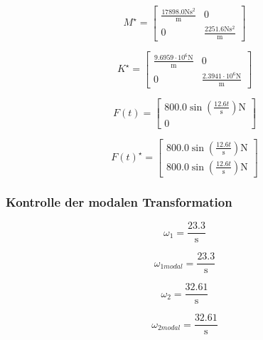 \documentclass[
  letterpaper,
  DIV=11]{scrreprt}
\begin{document}
\begin{equation}M^{\star} = \left[\begin{matrix}\frac{17898.0 \text{N} \text{s}^{2}}{\text{m}} & 0\\0 & \frac{2251.6 \text{N} \text{s}^{2}}{\text{m}}\end{matrix}\right]\end{equation}

\begin{equation}K^{\star} = \left[\begin{matrix}\frac{9.6959 \cdot 10^{6} \text{N}}{\text{m}} & 0\\0 & \frac{2.3941 \cdot 10^{6} \text{N}}{\text{m}}\end{matrix}\right]\end{equation}

\begin{equation}F(t) = \left[\begin{matrix}800.0 \sin{\left(\frac{12.6 t}{\text{s}} \right)} \text{N}\\0\end{matrix}\right]\end{equation}

\begin{equation}F(t)^{\star} = \left[\begin{matrix}800.0 \sin{\left(\frac{12.6 t}{\text{s}} \right)} \text{N}\\800.0 \sin{\left(\frac{12.6 t}{\text{s}} \right)} \text{N}\end{matrix}\right]\end{equation}

\hypertarget{kontrolle-der-modalen-transformation}{%
\subsubsection{Kontrolle der modalen
Transformation}\label{kontrolle-der-modalen-transformation}}

\begin{equation}\omega_{1} = \frac{23.3}{\text{s}}\end{equation}

\begin{equation}\omega_{1 modal} = \frac{23.3}{\text{s}}\end{equation}

\begin{equation}\omega_{2} = \frac{32.61}{\text{s}}\end{equation}

\begin{equation}\omega_{2 modal} = \frac{32.61}{\text{s}}\end{equation}
\end{document}

